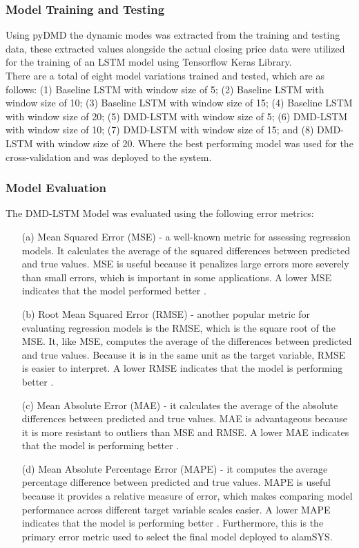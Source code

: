 \subsubsection{Model Training and Testing}
\label{subsubsec:model_training_testing}
Using pyDMD the dynamic modes was extracted from the training and testing data,
these extracted values alongside the actual closing price data were utilized for
the training of an LSTM model using Tensorflow Keras Library.
\\

There are a total of eight model variations trained and tested, which are as follows:
(1) Baseline LSTM with window size of 5;
(2) Baseline LSTM with window size of 10;
(3) Baseline LSTM with window size of 15;
(4) Baseline LSTM with window size of 20;
(5) DMD-LSTM with window size of 5;
(6) DMD-LSTM with window size of 10;
(7) DMD-LSTM with window size of 15; and
(8) DMD-LSTM with window size of 20.
Where the best performing model was used for the cross-validation and was deployed to the system.

\subsubsection{Model Evaluation}
\label{subsubsec:model_evaluation}
The DMD-LSTM Model was evaluated using the following error metrics:
\begin{itemize}
    \item[(a)] Mean Squared Error (MSE) - a well-known metric for assessing regression models. 
    It calculates the average of the squared differences between predicted and true values. 
    MSE is useful because it penalizes large errors more severely than small errors, 
    which is important in some applications. A lower MSE indicates that the model performed better
    \cite{StephMSE}.
    \item[(b)] Root Mean Squared Error (RMSE) - another popular metric for evaluating regression models 
    is the RMSE, which is the square root of the MSE. It, like MSE, computes the average of the 
    differences between predicted and true values. Because it is in the same unit as the target variable, 
    RMSE is easier to interpret. A lower RMSE indicates that the model is performing better
    \cite{StephRMSE}.
    \item[(c)] Mean Absolute Error (MAE) - it calculates the average of the absolute differences 
    between predicted and true values. MAE is advantageous because it is more resistant to 
    outliers than MSE and RMSE. A lower MAE indicates that the model is performing better
    \cite{SecretDataScientistMAE}.
    \item[(d)] Mean Absolute Percentage Error (MAPE) - it computes the average percentage difference 
    between predicted and true values. MAPE is useful because it provides a relative measure of error, 
    which makes comparing model performance across different target variable scales easier. 
    A lower MAPE indicates that the model is performing better
    \cite{Allwright2022MAPE}.
    Furthermore, this is the primary error metric used to select the final model deployed to alamSYS.
\end{itemize}

